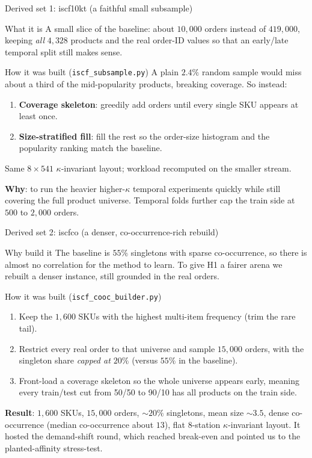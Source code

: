 \documentclass[11pt,aspectratio=169]{beamer}
\begin{document}
\begin{frame}{Derived set 1: iscf10kt (a faithful small subsample)}
  \begin{block}{What it is}
  A small slice of the baseline: about $10{,}000$ orders instead of $419{,}000$, keeping \emph{all} $4{,}328$ products and the real order-ID values so that an early/late temporal split still makes sense.
  \end{block}
  \begin{block}{How it was built (\texttt{iscf\_subsample.py})}
  A plain $2.4\%$ random sample would miss about a third of the mid-popularity products, breaking coverage. So instead:
  \begin{enumerate}
    \item \textbf{Coverage skeleton}: greedily add orders until every single SKU appears at least once.
    \item \textbf{Size-stratified fill}: fill the rest so the order-size histogram and the popularity ranking match the baseline.
  \end{enumerate}
  Same $8\times541$ $\kappa$-invariant layout; workload recomputed on the smaller stream.
  \end{block}
  \textbf{Why}: to run the heavier higher-$\kappa$ temporal experiments quickly while still covering the full product universe. Temporal folds further cap the train side at $500$ to $2{,}000$ orders.
\end{frame}

\begin{frame}{Derived set 2: iscfco (a denser, co-occurrence-rich rebuild)}
  \begin{block}{Why build it}
  The baseline is $55\%$ singletons with sparse co-occurrence, so there is almost no correlation for the method to learn. To give H1 a fairer arena we rebuilt a denser instance, still grounded in the real orders.
  \end{block}
  \begin{block}{How it was built (\texttt{iscf\_cooc\_builder.py})}
  \begin{enumerate}
    \item Keep the $1{,}600$ SKUs with the highest multi-item frequency (trim the rare tail).
    \item Restrict every real order to that universe and sample $15{,}000$ orders, with the singleton share \emph{capped at $20\%$} (versus $55\%$ in the baseline).
    \item Front-load a coverage skeleton so the whole universe appears early, meaning every train/test cut from 50/50 to 90/10 has all products on the train side.
  \end{enumerate}
  \end{block}
  \textbf{Result}: $1{,}600$ SKUs, $15{,}000$ orders, $\sim\!20\%$ singletons, mean size $\sim\!3.5$, dense co-occurrence (median co-occurrence about $13$), flat $8$-station $\kappa$-invariant layout. It hosted the demand-shift round, which reached break-even and pointed us to the planted-affinity stress-test.
\end{frame}
\end{document}
